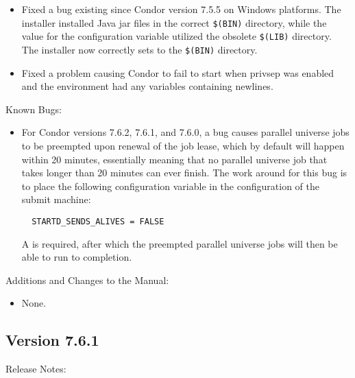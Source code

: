 \begin{itemize}
\item Fixed a bug existing since Condor version 7.5.5 on Windows platforms.
The installer installed Java jar files in the correct \verb|$(BIN)| directory,
while the value for the configuration variable 
 utilized the obsolete \verb|$(LIB)|
directory.
The installer now correctly sets  
to the \verb|$(BIN)| directory.

\item Fixed a problem causing Condor to fail to start when
privsep was enabled and the environment had any variables
containing newlines.

\end{itemize}

\noindent Known Bugs:

\begin{itemize}

\item For Condor versions 7.6.2, 7.6.1, and 7.6.0,
a bug causes parallel universe jobs to be preempted upon 
renewal of the job lease, 
which by default will happen within 20 minutes, 
essentially meaning that no parallel universe job that takes
longer than 20 minutes can ever finish.
The work around for this bug is to place the following
configuration variable in the configuration of the submit machine:
\begin{verbatim}
  STARTD_SENDS_ALIVES = FALSE
\end{verbatim}
A  is required, 
after which the preempted parallel universe jobs will then be
able to run to completion.

\end{itemize}

\noindent Additions and Changes to the Manual:

\begin{itemize}

\item None.

\end{itemize}


\subsection*{\label{sec:New-7-6-1}Version 7.6.1}

\noindent Release Notes:

